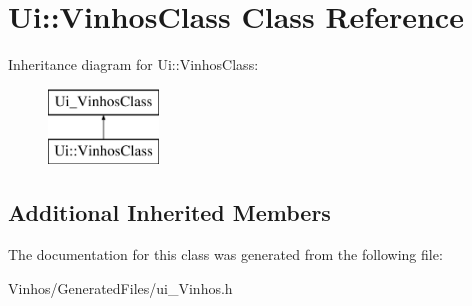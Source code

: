 \hypertarget{class_ui_1_1_vinhos_class}{}\section{Ui\+:\+:Vinhos\+Class Class Reference}
\label{class_ui_1_1_vinhos_class}
Inheritance diagram for Ui\+:\+:Vinhos\+Class\+:\begin{figure}[H]
\begin{center}
\leavevmode
\includegraphics[height=2.000000cm]{class_ui_1_1_vinhos_class}
\end{center}
\end{figure}
\subsection*{Additional Inherited Members}


The documentation for this class was generated from the following file\+:\begin{DoxyCompactItemize}
\item 
Vinhos/\+Generated\+Files/ui\+\_\+\+Vinhos.\+h\end{DoxyCompactItemize}
